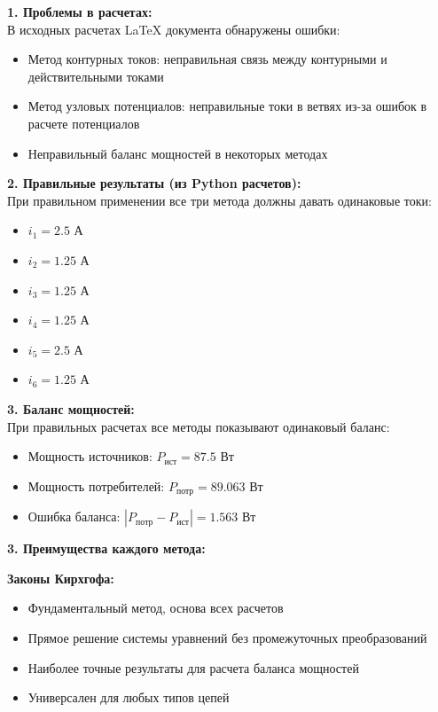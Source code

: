 \begin{flushleft}
\textbf{1. Проблемы в расчетах:} \\
В исходных расчетах LaTeX документа обнаружены ошибки:
\begin{itemize}
    \item Метод контурных токов: неправильная связь между контурными и действительными токами
    \item Метод узловых потенциалов: неправильные токи в ветвях из-за ошибок в расчете потенциалов
    \item Неправильный баланс мощностей в некоторых методах
\end{itemize}

\textbf{2. Правильные результаты (из Python расчетов):} \\
При правильном применении все три метода должны давать одинаковые токи:
\begin{itemize}
    \item $i_1 = 2.5$ А
    \item $i_2 = 1.25$ А  
    \item $i_3 = 1.25$ А
    \item $i_4 = 1.25$ А
    \item $i_5 = 2.5$ А
    \item $i_6 = 1.25$ А
\end{itemize}

\textbf{3. Баланс мощностей:} \\
При правильных расчетах все методы показывают одинаковый баланс:
\begin{itemize}
    \item Мощность источников: $P_{ист} = 87.5$ Вт
    \item Мощность потребителей: $P_{потр} = 89.063$ Вт
    \item Ошибка баланса: $|P_{потр} - P_{ист}| = 1.563$ Вт
\end{itemize}

\textbf{3. Преимущества каждого метода:}

\textbf{Законы Кирхгофа:}
\begin{itemize}
    \item Фундаментальный метод, основа всех расчетов
    \item Прямое решение системы уравнений без промежуточных преобразований
    \item Наиболее точные результаты для расчета баланса мощностей
    \item Универсален для любых типов цепей
\end{itemize}


\end{flushleft}
